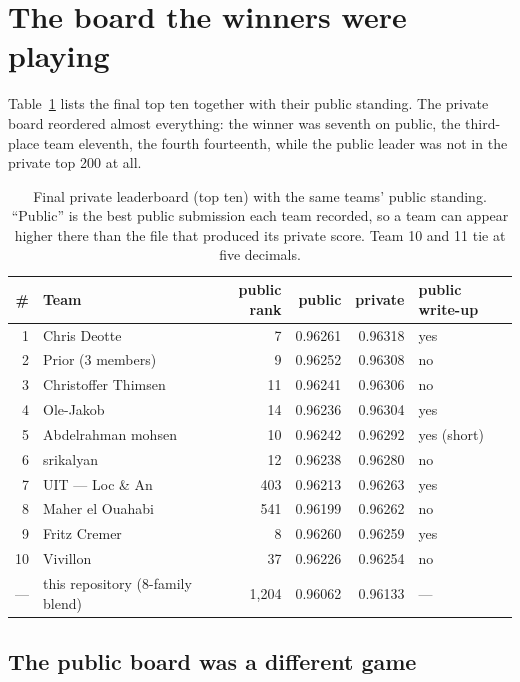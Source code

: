 \section{The board the winners were playing}
\label{sec:board}

Table~\ref{tab:board} lists the final top ten together with their public standing.
The private board reordered almost everything: the winner was seventh on public, the
third-place team eleventh, the fourth fourteenth, while the public leader was not in the
private top 200 at all.

\begin{table}[t]
\centering
\small
\caption{Final private leaderboard (top ten) with the same teams' public standing.
``Public'' is the best public submission each team recorded, so a team can appear higher
there than the file that produced its private score. Team 10 and 11 tie at five decimals.}
\label{tab:board}
\begin{tabular}{rlrrrl}
\toprule
\# & Team & public rank & public \auc{} & private \auc{} & public write-up\\
\midrule
1  & Chris Deotte              & 7   & 0.96261 & 0.96318 & yes \citep{kaggle_first}\\
2  & Prior (3 members)         & 9   & 0.96252 & 0.96308 & no\\
3  & Christoffer Thimsen       & 11  & 0.96241 & 0.96306 & no\\
4  & Ole-Jakob                 & 14  & 0.96236 & 0.96304 & yes \citep{kaggle_fourth}\\
5  & Abdelrahman mohsen        & 10  & 0.96242 & 0.96292 & yes (short) \citep{kaggle_fifth}\\
6  & srikalyan                 & 12  & 0.96238 & 0.96280 & no\\
7  & UIT --- Loc \& An         & 403 & 0.96213 & 0.96263 & yes \citep{kaggle_seventh}\\
8  & Maher el Ouahabi          & 541 & 0.96199 & 0.96262 & no\\
9  & Fritz Cremer              & 8   & 0.96260 & 0.96259 & yes \citep{kaggle_ninth}\\
10 & Vivillon                  & 37  & 0.96226 & 0.96254 & no\\
\midrule
--- & this repository (8-family blend) & 1{,}204 & 0.96062 & 0.96133 & ---\\
\bottomrule
\end{tabular}
\end{table}

\subsection{The public board was a different game}

